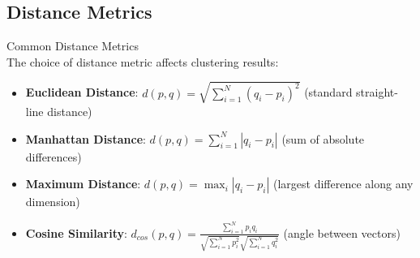 \subsection{Distance Metrics}

\begin{definition}{Common Distance Metrics}\\
The choice of distance metric affects clustering results:
\begin{itemize}
    \item \textbf{Euclidean Distance}: $d(p, q) = \sqrt{\sum_{i=1}^{N} (q_i - p_i)^2}$ (standard straight-line distance)
    \item \textbf{Manhattan Distance}: $d(p, q) = \sum_{i=1}^{N} |q_i - p_i|$ (sum of absolute differences)
    \item \textbf{Maximum Distance}: $d(p, q) = \max_i |q_i - p_i|$ (largest difference along any dimension)
    \item \textbf{Cosine Similarity}: $d_{cos}(p, q) = \frac{\sum_{i=1}^{N} p_i q_i}{\sqrt{\sum_{i=1}^{N} p_i^2} \sqrt{\sum_{i=1}^{N} q_i^2}}$ (angle between vectors)
\end{itemize}
\end{definition}

